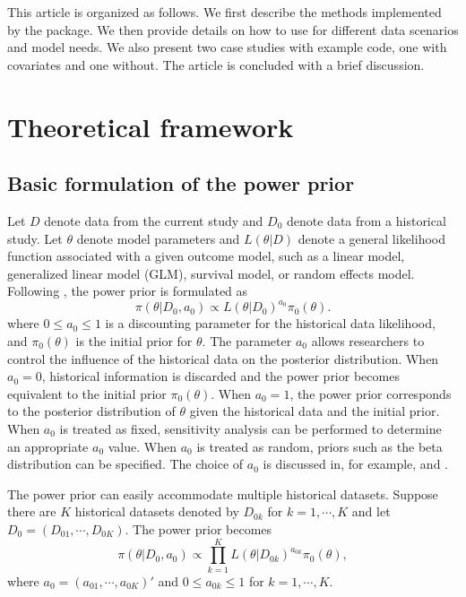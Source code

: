 This article is organized as follows. We first describe the methods implemented by the package. We then provide details on how to use  for different data scenarios and model needs. We also present two case studies with example code, one with covariates and one without. The article is concluded with a brief discussion.

\section*{Theoretical framework} \label{sec:tf}


\subsection*{Basic formulation of the power prior}

Let $D$ denote data from the current study and $D_0$ denote data from a historical study. Let $\theta$ denote model parameters and $L(\theta|D)$ denote a general likelihood function associated with a given outcome model, such as a linear model, generalized linear model (GLM), survival model, or random effects model. Following \cite{chen_2000}, the power prior is formulated as $$\pi(\theta|D_0, a_0) \propto L(\theta|D_0)^{a_0}\pi_0(\theta).$$ where $0 \le a_0 \le 1$ is a  discounting parameter for the historical data likelihood, and $\pi_0(\theta)$ is the initial prior for $\theta$. The parameter $a_0$ allows researchers to control the influence of the historical data on the posterior distribution. When $a_0=0$, historical information is discarded and the power prior becomes equivalent to the initial prior $\pi_0(\theta)$. When $a_0=1$, the power prior corresponds to the posterior distribution of $\theta$ given the historical data and the initial prior. When $a_0$ is treated as fixed, sensitivity analysis can be performed to determine an appropriate $a_0$ value. When $a_0$ is treated as random, priors such as the beta distribution can be specified. The choice of $a_0$ is discussed in, for example,  \cite{ibrahim_2015} and \cite{psioda_2018}.   

The power prior can easily accommodate multiple historical datasets. Suppose there are $K$ historical datasets denoted by $D_{0k}$ for $k=1,\cdots, K$ and let $D_0=(D_{01}, \cdots, D_{0K})$. The power prior becomes $$\pi(\theta|D_0, a_0) \propto \prod_{k=1}^K L(\theta|D_{0k})^{a_{0k}}\pi_0(\theta),$$ where $a_0 = (a_{01},\cdots,a_{0K})'$ and $0\le a_{0k} \le 1$ for $k=1,\cdots,K$.


